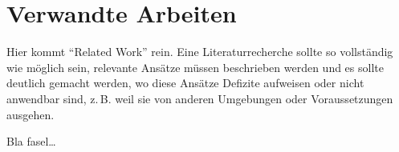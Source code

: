 

\section{Verwandte Arbeiten}
\label{ch:Grundlagen:sec:RelatedWork}
Hier kommt "`Related Work"' rein.
Eine Literaturrecherche sollte so vollständig wie möglich sein,
relevante Ansätze müssen beschrieben werden und es sollte deutlich 
gemacht werden, wo diese Ansätze Defizite aufweisen oder nicht
anwendbar sind, z.\,B. weil sie von anderen Umgebungen oder 
Voraussetzungen ausgehen.


Bla fasel\ldots

